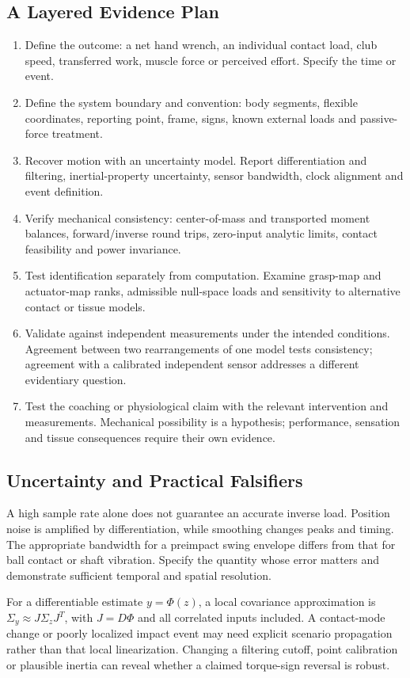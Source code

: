 \documentclass[11pt,a4paper]{article}
\begin{document}
\subsection{A Layered Evidence Plan}
\begin{enumerate}
\item Define the outcome: a net hand wrench, an individual contact load, club speed, transferred work, muscle force or perceived effort. Specify the time or event.
\item Define the system boundary and convention: body segments, flexible coordinates, reporting point, frame, signs, known external loads and passive-force treatment.
\item Recover motion with an uncertainty model. Report differentiation and filtering, inertial-property uncertainty, sensor bandwidth, clock alignment and event definition.
\item Verify mechanical consistency: center-of-mass and transported moment balances, forward/inverse round trips, zero-input analytic limits, contact feasibility and power invariance.
\item Test identification separately from computation. Examine grasp-map and actuator-map ranks, admissible null-space loads and sensitivity to alternative contact or tissue models.
\item Validate against independent measurements under the intended conditions. Agreement between two rearrangements of one model tests consistency; agreement with a calibrated independent sensor addresses a different evidentiary question.
\item Test the coaching or physiological claim with the relevant intervention and measurements. Mechanical possibility is a hypothesis; performance, sensation and tissue consequences require their own evidence.
\end{enumerate}

\subsection{Uncertainty and Practical Falsifiers}
A high sample rate alone does not guarantee an accurate inverse load. Position noise is amplified by differentiation, while smoothing changes peaks and timing. The appropriate bandwidth for a preimpact swing envelope differs from that for ball contact or shaft vibration. Specify the quantity whose error matters and demonstrate sufficient temporal and spatial resolution.

For a differentiable estimate $y=\Phi(z)$, a local covariance approximation is
$\Sigma_y\approx J\Sigma_zJ^T$, with $J=D\Phi$ and all correlated inputs included. A contact-mode change or poorly localized impact event may need explicit scenario propagation rather than that local linearization. Changing a filtering cutoff, point calibration or plausible inertia can reveal whether a claimed torque-sign reversal is robust.
\end{document}
